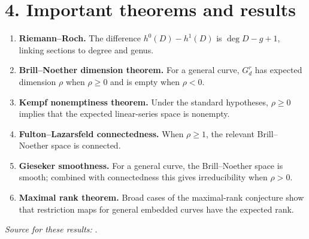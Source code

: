 \section*{4. Important theorems and results}
\begin{enumerate}[leftmargin=*,itemsep=0.35em]

\item \textbf{Riemann--Roch.} The difference $h^0(D)-h^1(D)$ is $\deg D-g+1$, linking sections to degree and genus.

\item \textbf{Brill--Noether dimension theorem.} For a general curve, $G^r_d$ has expected dimension $\rho$ when $\rho\geq0$ and is empty when $\rho<0$.

\item \textbf{Kempf nonemptiness theorem.} Under the standard hypotheses, $\rho\geq0$ implies that the expected linear-series space is nonempty.

\item \textbf{Fulton--Lazarsfeld connectedness.} When $\rho\geq1$, the relevant Brill--Noether space is connected.

\item \textbf{Gieseker smoothness.} For a general curve, the Brill--Noether space is smooth; combined with connectedness this gives irreducibility when $\rho>0$.

\item \textbf{Maximal rank theorem.} Broad cases of the maximal-rank conjecture show that restriction maps for general embedded curves have the expected rank.
\end{enumerate}
\noindent\emph{Source for these results:} \cite{brill_noether_theory_ref1}.

